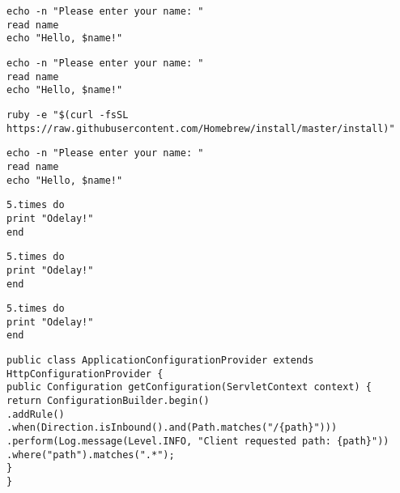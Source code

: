\begin{verbatim}
echo -n "Please enter your name: "
read name
echo "Hello, $name!"
\end{verbatim}

\begin{verbatim}
echo -n "Please enter your name: "
read name
echo "Hello, $name!"
\end{verbatim}

\begin{verbatim}
ruby -e "$(curl -fsSL https://raw.githubusercontent.com/Homebrew/install/master/install)"
\end{verbatim}

\begin{verbatim}
echo -n "Please enter your name: "
read name
echo "Hello, $name!"
\end{verbatim}

\begin{verbatim}
5.times do
print "Odelay!"
end
\end{verbatim}

\begin{verbatim}
5.times do
print "Odelay!"
end
\end{verbatim}

\begin{verbatim}
5.times do
print "Odelay!"
end
\end{verbatim}

\begin{verbatim}
public class ApplicationConfigurationProvider extends HttpConfigurationProvider {
public Configuration getConfiguration(ServletContext context) {
return ConfigurationBuilder.begin()
.addRule()
.when(Direction.isInbound().and(Path.matches("/{path}")))
.perform(Log.message(Level.INFO, "Client requested path: {path}"))
.where("path").matches(".*");
}
}
\end{verbatim}
